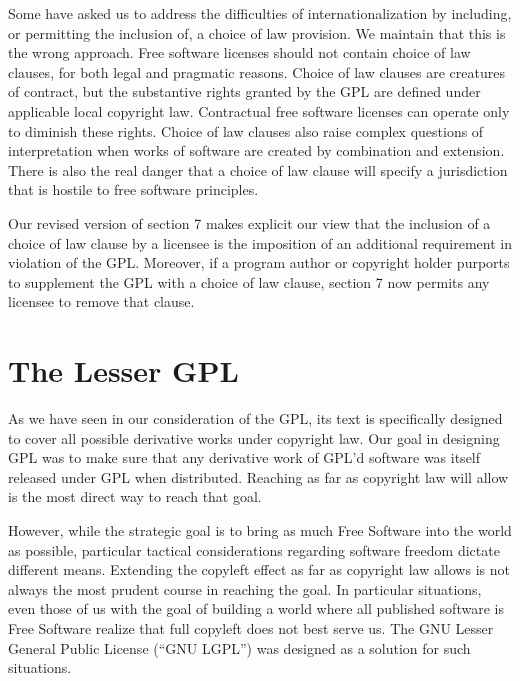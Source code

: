 
Some have asked us to address the difficulties of internationalization
by including, or permitting the inclusion of, a choice of law
provision.  We maintain that this is the wrong approach.  Free
software licenses should not contain choice of law clauses, for both
legal and pragmatic reasons.  Choice of law clauses are creatures of
contract, but the substantive rights granted by the GPL are defined
under applicable local copyright law. Contractual free software
licenses can operate only to diminish these rights.  Choice of law
clauses also raise complex questions of interpretation when works of
software are created by combination and extension.  There is also the
real danger that a choice of law clause will specify a jurisdiction
that is hostile to free software principles.


Our revised version of section 7 makes explicit our view that the
inclusion of a choice of law clause by a licensee is the imposition of
an additional requirement in violation of the GPL.  Moreover, if a
program author or copyright holder purports to supplement the GPL with
a choice of law clause, section 7 now permits any licensee to remove
that clause.

\chapter{The Lesser GPL}

As we have seen in our consideration of the GPL, its text is specifically
designed to cover all possible derivative works under copyright law. Our
goal in designing GPL was to make sure that any derivative work of GPL'd
software was itself released under GPL when distributed. Reaching as far
as copyright law will allow is the most direct way to reach that goal.

However, while the strategic goal is to bring as much Free Software
into the world as possible, particular tactical considerations
regarding software freedom dictate different means. Extending the
copyleft effect as far as copyright law allows is not always the most
prudent course in reaching the goal. In particular situations, even
those of us with the goal of building a world where all published
software is Free Software realize that full copyleft does not best
serve us. The GNU Lesser General Public License (``GNU LGPL'') was
designed as a solution for such situations.

